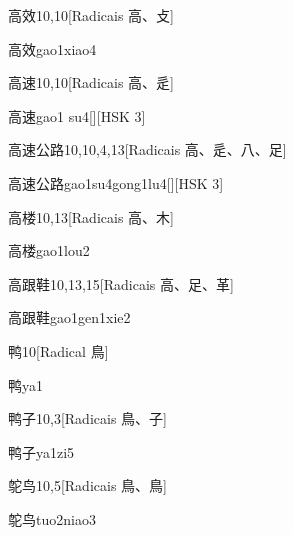 \begin{entry}{高效}{10,10}[Radicais ⾼、⽁]
  \begin{phonetics}{高效}{gao1xiao4}
  \end{phonetics}
\end{entry}

\begin{entry}{高速}{10,10}[Radicais ⾼、⾡]
  \begin{phonetics}{高速}{gao1 su4}[][HSK 3]
  \end{phonetics}
\end{entry}

\begin{entry}{高速公路}{10,10,4,13}[Radicais ⾼、⾡、⼋、⾜]
  \begin{phonetics}{高速公路}{gao1su4gong1lu4}[][HSK 3]
  \end{phonetics}
\end{entry}

\begin{entry}{高楼}{10,13}[Radicais ⾼、⽊]
  \begin{phonetics}{高楼}{gao1lou2}
  \end{phonetics}
\end{entry}

\begin{entry}{高跟鞋}{10,13,15}[Radicais ⾼、⾜、⾰]
  \begin{phonetics}{高跟鞋}{gao1gen1xie2}
  \end{phonetics}
\end{entry}

\begin{entry}{鸭}{10}[Radical ⿃]
  \begin{phonetics}{鸭}{ya1}
  \end{phonetics}
\end{entry}

\begin{entry}{鸭子}{10,3}[Radicais ⿃、⼦]
  \begin{phonetics}{鸭子}{ya1zi5}
  \end{phonetics}
\end{entry}

\begin{entry}{鸵鸟}{10,5}[Radicais ⿃、⿃]
  \begin{phonetics}{鸵鸟}{tuo2niao3}
  \end{phonetics}
\end{entry}



